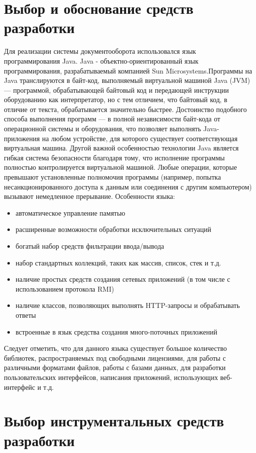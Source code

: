 \documentclass[14pt,a4paper]{reportmod}
\begin{document}
\section{Выбор и обоснование средств разработки}
Для реализации системы документооборота использовался язык программирования Java. Java - объектно-ориентированный язык программирования, разрабатываемый компанией Sun Microsystems.Программы на Java транслируются в байт-код, выполняемый виртуальной машиной Java (JVM) — программой, обрабатывающей байтовый код и передающей инструкции оборудованию как интерпретатор, но с тем отличием, что байтовый код, в отличие от текста, обрабатывается значительно быстрее.
Достоинство подобного способа выполнения программ — в полной независимости байт-кода от операционной системы и оборудования, что позволяет выполнять Java-приложения на любом устройстве, для которого существует соответствующая виртуальная машина. Другой важной особенностью технологии Java является гибкая система безопасности благодаря тому, что исполнение программы полностью контролируется виртуальной машиной. Любые операции, которые превышают установленные полномочия программы (например, попытка несанкционированного доступа к данным или соединения с другим компьютером) вызывают немедленное прерывание.
Особенности языка:
\begin{itemize}
  \item автоматическое управление памятью
  \item расширенные возможности обработки исключительных ситуаций
  \item богатый набор средств фильтрации ввода/вывода
  \item набор стандартных коллекций, таких как массив, список, стек и т.д.
  \item наличие простых средств создания сетевых приложений (в том числе с использованием протокола RMI)
  \item наличие классов, позволяющих выполнять HTTP-запросы и обрабатывать ответы
  \item встроенные в язык средства создания много-поточных приложений
\end{itemize}
Следует отметить, что для данного языка существует большое количество библиотек, распространяемых под свободными лицензиями, для работы с различными форматами файлов, работы с базами данных, для разработки пользовательских интерфейсов, написания приложений, использующих веб-интерфейс и т.д.

\section{Выбор инструментальных средств разработки}
\end{document}
